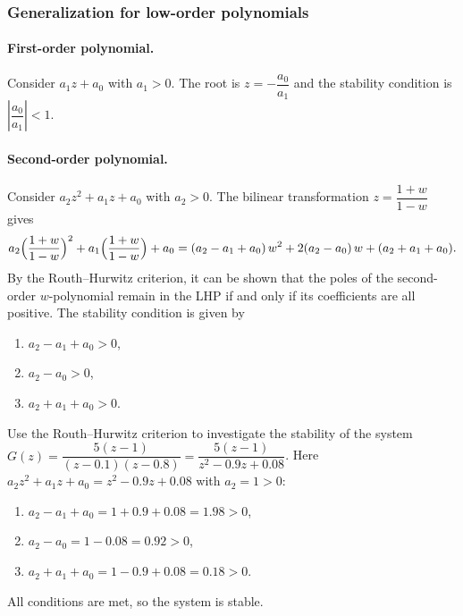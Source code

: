 \subsubsection*{Generalization for low-order polynomials}
\paragraph{First-order polynomial.} Consider $a_1z+a_0$ with $a_1>0$. The root is $z=-\dfrac{a_0}{a_1}$ and the
stability condition is $\left|\dfrac{a_0}{a_1}\right|<1$.

\paragraph{Second-order polynomial.} Consider $a_2z^{2}+a_1z+a_0$ with $a_2>0$. The bilinear transformation
$z=\dfrac{1+w}{1-w}$ gives
\[
  a_2\Bigl(\frac{1+w}{1-w}\Bigr)^{2}+a_1\Bigl(\frac{1+w}{1-w}\Bigr)+a_0
  =(a_2-a_1+a_0)\,w^{2}+2(a_2-a_0)\,w+(a_2+a_1+a_0).
\]
By the Routh--Hurwitz criterion, it can be shown that the poles of the second-order $w$-polynomial remain in
the LHP if and only if its coefficients are all positive. The stability condition is given by
\begin{enumerate}
  \item $a_2-a_1+a_0>0$,
  \item $a_2-a_0>0$,
  \item $a_2+a_1+a_0>0$.
\end{enumerate}

\begin{example}
Use the Routh--Hurwitz criterion to investigate the stability of the system
$G(z)=\dfrac{5(z-1)}{(z-0.1)(z-0.8)}=\dfrac{5(z-1)}{z^{2}-0.9z+0.08}$. Here $a_2z^{2}+a_1z+a_0=z^{2}-0.9z+0.08$ with $a_2=1>0$:
\begin{enumerate}
  \item $a_2-a_1+a_0=1+0.9+0.08=1.98>0$,
  \item $a_2-a_0=1-0.08=0.92>0$,
  \item $a_2+a_1+a_0=1-0.9+0.08=0.18>0$.
\end{enumerate}
All conditions are met, so the system is stable.
\end{example}

